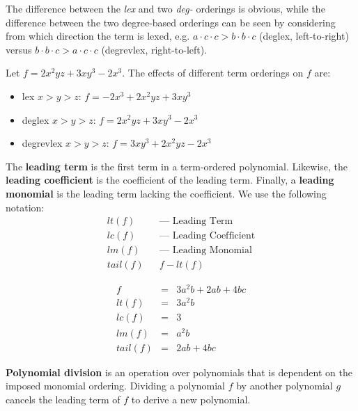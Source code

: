 The difference between the {\it lex} and two {\it deg-} orderings is
obvious, while the difference between the two degree-based orderings can be
seen by considering from which direction the term is lexed, e.g. $a\cdot c\cdot c > b\cdot b\cdot c$ (deglex, left-to-right)
versus $b\cdot b\cdot c > a \cdot c\cdot c$ (degrevlex, right-to-left). 

\begin{Example}
Let $f = 2x^2yz + 3xy^3 - 2x^3$. The effects of different term orderings on 
$f$ are:
\begin{itemize}
\item lex $x> y> z$: $f = -2x^3 + 2x^2yz + 3xy^3$
\item deglex $x>y>z$:  $f = 2x^2yz + 3xy^3 -2x^3$
\item degrevlex $x>y>z$: $f = 3xy^3 + 2x^2yz - 2x^3$
\end{itemize}
\end{Example}


\begin{Definition}
The {\bf leading term} is the first term in a term-ordered polynomial.
Likewise, the {\bf leading coefficient} is the coefficient of
the leading term. 
Finally, a {\bf leading monomial} is the leading term 
lacking the coefficient.  We use the following notation:
\begin{eqnarray}
     lt(f)&& \text{--- Leading Term} \\
     lc(f)&& \text{--- Leading Coefficient} \\
     lm(f)&& \text{--- Leading Monomial} \\
     tail(f)&& f - lt(f)
\end{eqnarray}
\end{Definition}

\begin{Example}
\begin{eqnarray}
     f      &=& 3a^2b + 2ab + 4bc \\
     lt(f)  &=& 3a^2b \\
     lc(f)  &=& 3 \\
     lm(f)  &=& a^2b \\
     tail(f) &=& 2ab+4bc
\end{eqnarray}
\end{Example}

{\bf Polynomial division} is an operation over polynomials that is dependent on
the imposed monomial ordering. Dividing a polynomial $f$ by another polynomial
$g$ cancels the leading term of $f$ to derive a new polynomial. 

